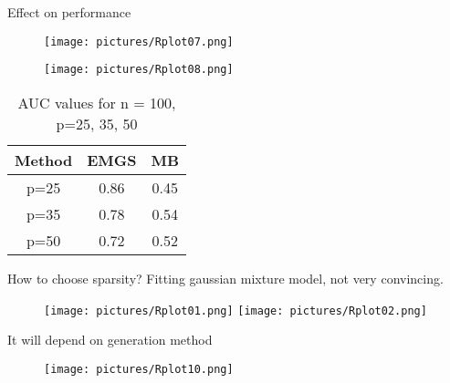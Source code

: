 \documentclass{beamer}
\begin{document}
\begin{frame}{Effect on performance}
	\begin{minipage}{.5\textwidth}
		\begin{figure}
			\centering
			\texttt{[image: pictures/Rplot07.png]}
		\end{figure}
	\end{minipage}
	\begin{minipage}{.5\textwidth}
		\begin{figure}
			\centering
			\texttt{[image: pictures/Rplot08.png]}
		\end{figure}
	\end{minipage}%
	\begin{minipage}{.5\textwidth}
		\begin{table}
			\centering
			\begin{tabular}{c c c}
				\toprule
				Method & EMGS & MB   \\
				\midrule
				p=25   & 0.86 & 0.45 \\
				\midrule
				p=35   & 0.78 & 0.54 \\
				\midrule
				p=50   & 0.72 & 0.52 \\
				\bottomrule
			\end{tabular}
			\caption{AUC values for n = 100, p=25, 35, 50}
		\end{table}
	\end{minipage}

\end{frame}
\begin{frame}{How to choose sparsity?}
	Fitting gaussian mixture model, not very convincing.
	\begin{figure}
		\centering
		\texttt{[image: pictures/Rplot01.png]}
		\texttt{[image: pictures/Rplot02.png]}
	\end{figure}
\end{frame}
\begin{frame}{It will depend on generation method}
	\begin{figure}
		\begin{center}
			\texttt{[image: pictures/Rplot10.png]}
		\end{center}
	\end{figure}

\end{frame}
\end{document}
